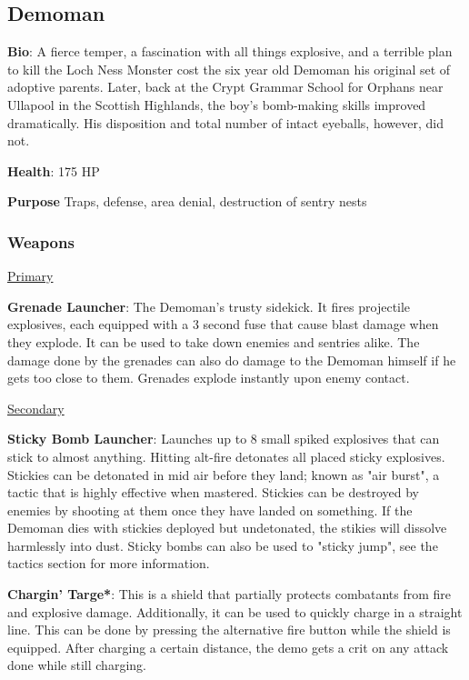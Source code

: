\subsection{Demoman}
\label{Demoman}
{\bf Bio}:
A fierce temper, a fascination with all things explosive, and a terrible plan to kill the Loch Ness Monster cost the six year old Demoman his original set of adoptive parents. Later, back at the Crypt Grammar School for Orphans near Ullapool in the Scottish Highlands, the boy's bomb-making skills improved dramatically. His disposition and total number of intact eyeballs, however, did not.

{\bf Health}: 175 HP

{\bf Purpose}
Traps, defense, area denial, destruction of sentry nests

\subsubsection {Weapons}


\begin {center}
\underline {Primary}
\end {center}

{\bf Grenade Launcher}: The Demoman's trusty sidekick. It fires projectile explosives, each equipped with a 3 second fuse that cause blast damage when they explode. It can be used to take down enemies and sentries alike. The damage done by the grenades can also do damage to the Demoman himself if he gets too close to them. Grenades explode instantly upon enemy contact.

\begin {center}
\underline {Secondary}
\end {center}

{\bf Sticky Bomb Launcher}: Launches up to 8 small spiked explosives that can stick to almost anything. Hitting alt-fire detonates all placed sticky explosives. Stickies can be detonated in mid air before they land; known as "air burst", a tactic that is highly effective when mastered. Stickies can be destroyed by enemies by shooting at them once they have landed on something. If the Demoman dies with stickies deployed but undetonated, the stikies will dissolve harmlessly into dust. Sticky bombs can also be used to "sticky jump", see the tactics section for more information. 

{\bf Chargin' Targe*}: This is a shield that partially protects combatants from fire and explosive damage. Additionally, it can be used to quickly charge in a straight line. This can be done by pressing the alternative fire button while the shield is equipped. After charging a certain distance, the demo gets a crit on any attack done while still charging. 

